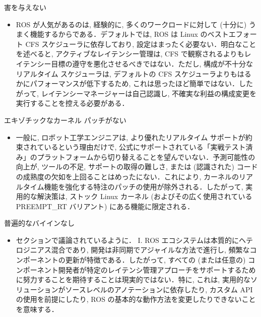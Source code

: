 \begin{frame}{害を与えない}
    \begin{itemize}
        \item ROS が人気があるのは, 経験的に, 多くのワークロードに対して (十分に) うまく機能するからである．デフォルトでは, ROS は Linux のベストエフォート CFS スケジューラに依存しており, 設定はまったく必要ない．明白なことを述べると, アクティブなレイテンシー管理は, CFS で観察されるよりもレイテンシー目標の遵守を悪化させるべきではない．ただし, 構成が不十分なリアルタイム スケジューラは, デフォルトの CFS スケジューラよりもはるかにパフォーマンスが低下するため, これは思ったほど簡単ではない．したがって, レイテンシーマネージャーは自己認識し, 不確実な利益の構成変更を実行することを控える必要がある．
    \end{itemize}
\end{frame}

\begin{frame}{エキゾチックなカーネル パッチがない}
    \begin{itemize}
        \item 一般に, ロボット工学エンジニアは, より優れたリアルタイム サポートが約束されているという理由だけで, 公式にサポートされている「実戦テスト済み」のプラットフォームから切り替えることを望んでいない．予測可能性の向上が, ツールの不足, サポートの取得の難しさ, または (認識された) コードの成熟度の欠如を上回ることはめったにない．これにより, カーネルのリアルタイム機能を強化する特注のパッチの使用が除外される．したがって, 実用的な解決策は, ストック Linux カーネル (およびその広く使用されている PREEMPT\_RT バリアント) にある機能に限定される．
    \end{itemize}
\end{frame}

\begin{frame}{普遍的なバイインなし}
    \begin{itemize}
        \item セクションで議論されているように． I. ROS エコシステムは本質的にヘテロジニアス混合であり, 開発は非同期でアジャイルな方法で進行し, 頻繁なコンポーネントの更新が特徴である．したがって, すべての (または任意の) コンポーネント開発者が特定のレイテンシ管理アプローチをサポートするために努力することを期待することは現実的ではない．特に, これは, 実用的なソリューションがソースレベルのアノテーションに依存したり, カスタム API の使用を前提にしたり, ROS の基本的な動作方法を変更したりできないことを意味する．
    \end{itemize}
\end{frame}

